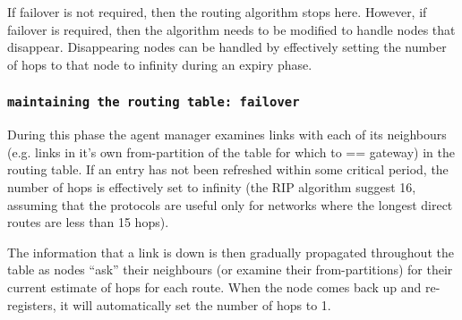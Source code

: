 \documentclass{cmspaper}
\begin{document}
If failover is not required, then the routing algorithm stops here.
However, if failover is required, then the algorithm needs to be
modified to handle nodes that disappear.  Disappearing nodes can be
handled by effectively setting the number of hops to that node to
infinity during an expiry phase.

\subsubsection{\textbf{\texttt{maintaining the routing table: failover}}}
During this phase the agent manager examines links with each of its
neighbours (e.g. links in it's own from-partition of the table for
which to == gateway) in the routing table.  If an entry has not been
refreshed within some critical period, the number of hops is
effectively set to infinity (the RIP algorithm suggest 16, assuming
that the protocols are useful only for networks where the longest
direct routes are less than 15 hops).

The information that a link is down is then gradually propagated
throughout the table as nodes ``ask'' their neighbours (or examine
their from-partitions) for their current estimate of hops for each
route.  When the node comes back up and re-registers, it will
automatically set the number of hops to 1.
\end{document}
